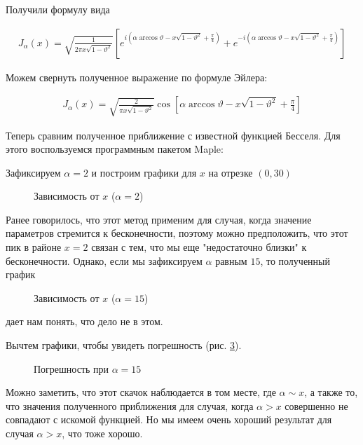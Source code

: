 \documentclass[14pt]{extarticle}
\begin{document}
Получили формулу вида

\begin{eqnarray}\nonumber
J_\alpha(x) = \sqrt{\frac{1}{2 \pi x \sqrt{1-\vartheta^2}}} \left[ e^{i(\alpha \arccos 
	\vartheta - x \sqrt{1 - \vartheta^2} + \frac{\pi}{4})}  + e^{-i(\alpha \arccos 
	\vartheta - x \sqrt{1 - \vartheta^2} + \frac{\pi}{4})} \right]
\end{eqnarray}

Можем свернуть полученное выражение по формуле Эйлера:

\begin{eqnarray}\nonumber
J_\alpha(x) = \sqrt{\frac{2}{\pi x \sqrt{1-\vartheta^2}}} \cos \left[\alpha \arccos 
	\vartheta - x \sqrt{1 - \vartheta^2} + \frac{\pi}{4}\right]
\end{eqnarray}

Теперь сравним полученное приближение с известной функцией Бесселя. Для этого воспользуемся программным пакетом Maple:

Зафиксируем $\alpha=2$ и построим графики для $x$ на отрезке $(0, 30)$

\begin{figure}[h!]
	\caption{Зависимость от $x$ ($\alpha=2$)}
	\label{ris:image3}
\end{figure}

Ранее говорилось, что этот метод применим для случая, когда значение параметров стремится к бесконечности, поэтому можно предположить, что этот пик в районе $x = 2$ связан с тем, что мы еще "недостаточно близки" к бесконечности. Однако, если мы зафиксируем $\alpha$ равным $15$, то полученный график  

\begin{figure}[h!]
	\caption{Зависимость от $x$ ($\alpha=15$)}
	\label{ris:image4}
\end{figure}
дает нам понять, что дело не в этом. 

Вычтем графики, чтобы увидеть погрешность (рис. \ref{ris:image5}).

\begin{figure}[h!]
	\caption{Погрешность при $\alpha=15$}
	\label{ris:image5}
\end{figure}

Можно заметить, что этот скачок наблюдается в том месте, где $\alpha \sim x$, а также то, что значения полученного приближения для случая, когда $\alpha > x$ совершенно не совпадают с искомой функцией. Но мы имеем очень хороший результат для случая $\alpha > x$, что тоже хорошо.
\end{document}

